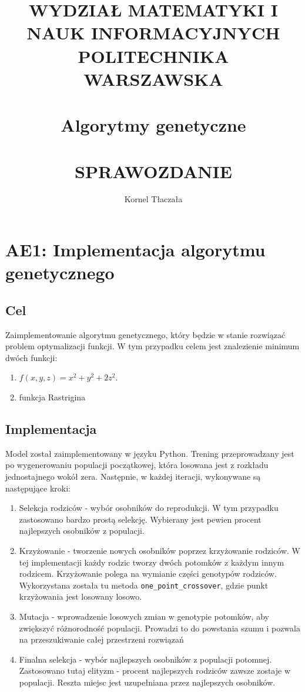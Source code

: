 \documentclass{article}
\begin{document}
\title{
\large WYDZIAŁ MATEMATYKI I NAUK INFORMACYJNYCH \\
\large POLITECHNIKA WARSZAWSKA\\
\hrulefill \\
\LARGE Algorytmy genetyczne\\
\hrulefill \\
\large SPRAWOZDANIE}
\author{Kornel Tłaczała}

\maketitle
\tableofcontents
\newpage
\section*{AE1: Implementacja algorytmu genetycznego}
\subsection*{Cel}
Zaimplementowanie algorytmu genetycznego, który będzie w stanie rozwiązać problem optymalizacji funkcji. W tym przypadku celem jest znalezienie minimum dwóch funkcji:
\begin{enumerate}
    \item $f(x, y, z) = x^2 + y^2 + 2z^2$.
    \item funkcja Rastrigina
\end{enumerate}
\subsection*{Implementacja}
Model został zaimplementowany w języku Python. Trening przeprowadzany jest po wygenerowaniu populacji początkowej, która losowana jest z rozkładu jednostajnego wokół zera. Następnie, w każdej iteracji, wykonywane są następujące kroki:
\begin{enumerate}
    \item Selekcja rodziców - wybór osobników do reprodukcji. W tym przypadku zastosowano bardzo prostą selekcję. Wybierany jest pewien procent najlepszych osobników z populacji.
    \item Krzyżowanie - tworzenie nowych osobników poprzez krzyżowanie rodziców. W tej implementacji każdy rodzic tworzy dwóch potomków z każdym innym rodzicem. Krzyżowanie polega na wymianie części genotypów rodziców. Wykorzystana została tu metoda \texttt{one\_point\_crossover}, gdzie punkt krzyżowania jest losowany losowo.
    \item Mutacja - wprowadzenie losowych zmian w genotypie potomków, aby zwiększyć różnorodność populacji. Prowadzi to do powstania szumu i pozwala na przeszukiwanie całej przestrzeni rozwiązań
    \item Finalna selekcja - wybór najlepszych osobników z populacji potomnej. Zastosowano tutaj elityzm - procent najlepszych rodziców zawsze zostaje w populacji. Reszta miejsc jest uzupełniana przez najlepszych osobników.
\end{enumerate}
\end{document}
